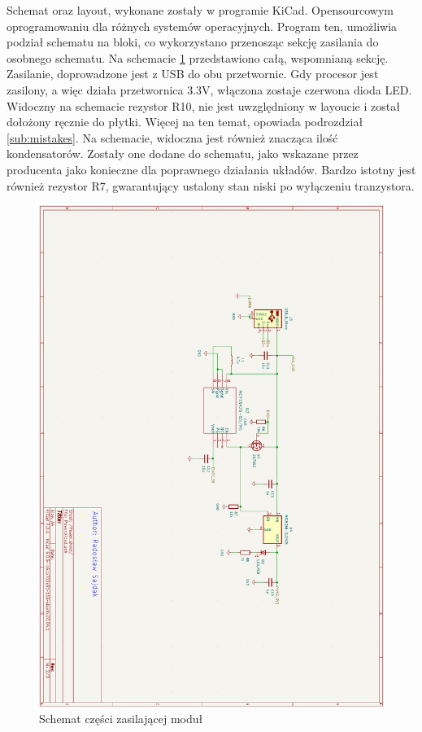 Schemat oraz layout, wykonane zostały w programie KiCad. Opensourcowym oprogramowaniu dla różnych systemów operacyjnych. Program ten, umożliwia podział schematu na bloki, co wykorzystano przenosząc sekcję zasilania do osobnego schematu. Na schemacie \ref{img:power_sch} przedstawiono całą, wspomnianą sekcję. Zasilanie, doprowadzone jest z USB do obu przetwornic. Gdy procesor jest zasilony, a więc działa przetwornica 3.3V, włączona zostaje czerwona dioda LED. Widoczny na schemacie rezystor R10, nie jest uwzględniony w layoucie i został dołożony ręcznie do płytki. Więcej na ten temat, opowiada podrozdział \ref{sub:mistakes}.
\newline Na schemacie, widoczna jest również znacząca ilość kondensatorów. Zostały one dodane do schematu, jako wskazane przez producenta jako konieczne dla poprawnego działania układów. Bardzo istotny jest również rezystor R7, gwarantujący ustalony stan niski po wyłączeniu tranzystora.
\begin{figure}[H]
    \centering
    \includegraphics[width=\textwidth, height=\textheight, keepaspectratio]{Graphics/power_sch.png}
    \caption{Schemat części zasilającej moduł}
    \label{img:power_sch}
\end{figure}
